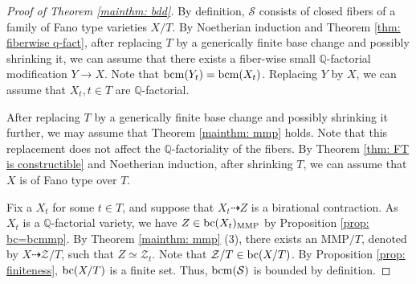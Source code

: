 \documentclass[11pt,oneside,reqno]{amsart}
\numberwithin{equation}{section}
\theoremstyle{definition}
\newcommand{\bc}{{\rm {bc}}}
\newcommand{\bQ}{\mathbb{Q}}
\newcommand{\mS}{\mathcal{S}}
\newcommand{\mZ}{\mathcal{Z}}
\begin{document}
\begin{proof}[Proof of Theorem \ref{mainthm: bdd}]
By definition,  $\mS$ consists of closed fibers of a family of Fano type varieties $X/T$. By Noetherian induction and Theorem \ref{thm: fiberwise q-fact}, after replacing $T$ by a generically finite base change and possibly shrinking it, we can assume that there exists a fiber-wise small $\bQ$-factorial modification $Y \to X$. Note that  ${\rm bcm}(Y_t) = {\rm bcm}(X_t)$. Replacing $Y$ by $X$, we can assume that $X_t, t\in T$ are $\bQ$-factorial. 

After replacing $T$ by a generically finite base change and possibly shrinking it further, we may assume that Theorem \ref{mainthm: mmp} holds. Note that this replacement does not affect the $\bQ$-factoriality of the fibers. By Theorem \ref{thm: FT is constructible} and Noetherian induction, after shrinking $T$, we can assume that $X$ is of Fano type over $T$. 

Fix a $X_t$ for some $t\in T$, and suppose that $X_t \dasharrow Z$ is a birational contraction. As $X_t$ is a $\bQ$-factorial variety, we have $Z\in \bc(X_t)_{\rm MMP}$ by Proposition \ref{prop: bc=bcmmp}. By Theorem \ref{mainthm: mmp} (3), there exists an MMP$/T$, denoted by $X \dasharrow \mZ/T$, such that $Z \simeq \mZ_t$. Note that $\mZ/T\in \bc(X/T)$. By Proposition \ref{prop: finiteness}, $\bc(X/T)$ is a finite set. Thus, ${\rm bcm}(\mS)$ is bounded by definition.
\end{proof}
\end{document}
